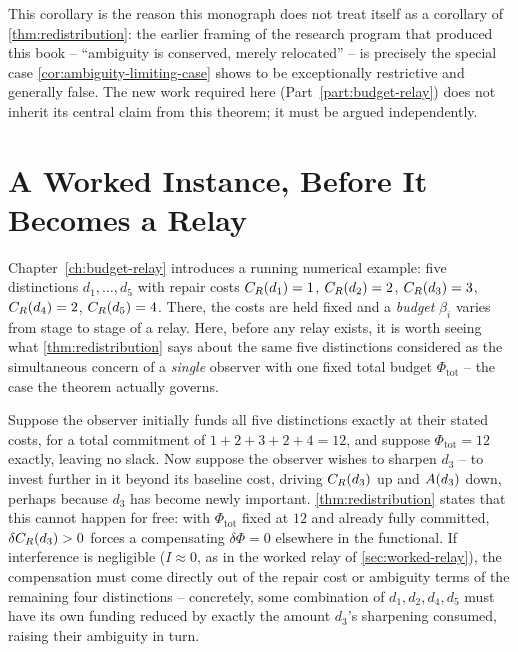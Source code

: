 This corollary is the reason this monograph does not treat itself as a
corollary of \cref{thm:redistribution}: the earlier framing of the
research program that produced this book -- ``ambiguity is conserved,
merely relocated'' -- is precisely the special case
\cref{cor:ambiguity-limiting-case} shows to be exceptionally restrictive
and generally false. The new work required here
(Part~\ref{part:budget-relay}) does not inherit its central claim from
this theorem; it must be argued independently.

\section{A Worked Instance, Before It Becomes a Relay}
\label{sec:redistribution-worked}

Chapter~\ref{ch:budget-relay} introduces a running numerical example: five
distinctions $d_1, \ldots, d_5$ with repair costs $C_R(d_1)=1$,
$C_R(d_2)=2$, $C_R(d_3)=3$, $C_R(d_4)=2$,
$C_R(d_5)=4$. There, the costs are held fixed and a \emph{budget}
$\beta_i$ varies from stage to stage of a relay. Here, before any relay
exists, it is worth seeing what \cref{thm:redistribution} says about the
same five distinctions considered as the simultaneous concern of a
\emph{single} observer with one fixed total budget
$\Phi_{\mathrm{tot}}$ -- the case the theorem actually governs.

Suppose the observer initially funds all five distinctions exactly at
their stated costs, for a total commitment of $1+2+3+2+4 = 12$, and
suppose $\Phi_{\mathrm{tot}} = 12$ exactly, leaving no slack. Now suppose
the observer wishes to sharpen $d_3$ -- to invest further in it beyond its
baseline cost, driving $C_R(d_3)$ up and $A(d_3)$ down, perhaps
because $d_3$ has become newly important. \cref{thm:redistribution}
states that this cannot happen for free: with $\Phi_{\mathrm{tot}}$ fixed
at $12$ and already fully committed, $\delta C_R(d_3) > 0$ forces a
compensating $\delta \Phi = 0$ elsewhere in the functional. If
interference is negligible ($I \approx 0$, as in the worked relay of
\cref{sec:worked-relay}), the compensation must come directly out of the
repair cost or ambiguity terms of the remaining four distinctions --
concretely, some combination of $d_1, d_2, d_4, d_5$ must have its own
funding reduced by exactly the amount $d_3$'s sharpening consumed, raising
their ambiguity in turn.

